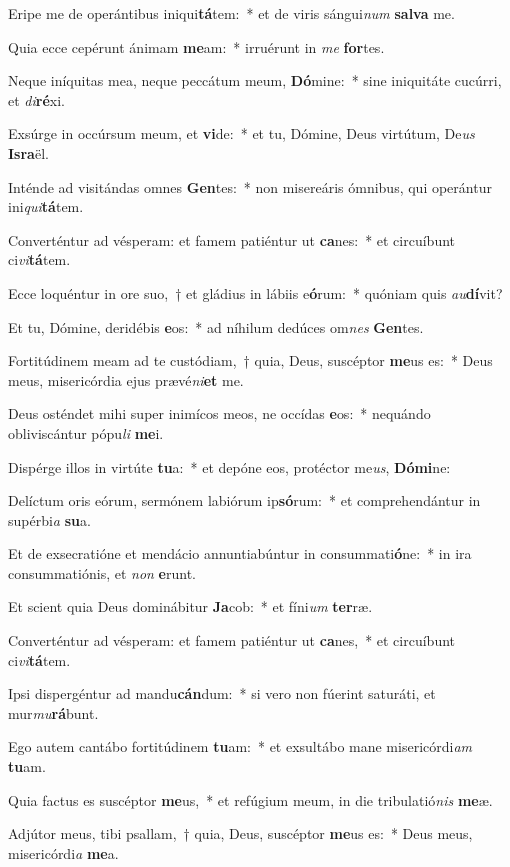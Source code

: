 \item Eripe me de operántibus iniqui\textbf{tá}tem:~* et de viris sángui\textit{num} \textbf{sal}\textbf{va} me.
\item Quia ecce cepérunt ánimam \textbf{me}am:~* irruérunt in \textit{me} \textbf{for}tes.
\item Neque iníquitas mea, neque peccátum meum, \textbf{Dó}mine:~* sine iniquitáte cucúrri, et \textit{di}\textbf{ré}xi.
\item Exsúrge in occúrsum meum, et \textbf{vi}de:~* et tu, Dómine, Deus virtútum, De\textit{us} \textbf{Is}\textbf{ra}ël.
\item Inténde ad visitándas omnes \textbf{Gen}tes:~* non misereáris ómnibus, qui operántur ini\textit{qui}\textbf{tá}tem.
\item Converténtur ad vésperam: et famem patiéntur ut \textbf{ca}nes:~* et circuíbunt ci\textit{vi}\textbf{tá}tem.
\item Ecce loquéntur in ore suo,~† et gládius in lábiis e\textbf{ó}rum:~* quóniam quis \textit{au}\textbf{dí}vit?
\item Et tu, Dómine, deridébis \textbf{e}os:~* ad níhilum dedúces om\textit{nes} \textbf{Gen}tes.
\item Fortitúdinem meam ad te custódiam,~† quia, Deus, suscéptor \textbf{me}us es:~* Deus meus, misericórdia ejus prævé\textit{ni}\textbf{et} me.
\item Deus osténdet mihi super inimícos meos, ne occídas \textbf{e}os:~* nequándo obliviscántur pópu\textit{li} \textbf{me}i.
\item Dispérge illos in virtúte \textbf{tu}a:~* et depóne eos, protéctor me\textit{us}, \textbf{Dó}\textbf{mi}ne:
\item Delíctum oris eórum, sermónem labiórum ip\textbf{só}rum:~* et comprehendántur in supérbi\textit{a} \textbf{su}a.
\item Et de exsecratióne et mendácio annuntiabúntur in consummati\textbf{ó}ne:~* in ira consummatiónis, et \textit{non} \textbf{e}runt.
\item Et scient quia Deus dominábitur \textbf{Ja}cob:~* et fíni\textit{um} \textbf{ter}ræ.
\item Converténtur ad vésperam: et famem patiéntur ut \textbf{ca}nes,~* et circuíbunt ci\textit{vi}\textbf{tá}tem.
\item Ipsi dispergéntur ad mandu\textbf{cán}dum:~* si vero non fúerint saturáti, et mur\textit{mu}\textbf{rá}bunt.
\item Ego autem cantábo fortitúdinem \textbf{tu}am:~* et exsultábo mane misericórdi\textit{am} \textbf{tu}am.
\item Quia factus es suscéptor \textbf{me}us,~* et refúgium meum, in die tribulatió\textit{nis} \textbf{me}æ.
\item Adjútor meus, tibi psallam,~† quia, Deus, suscéptor \textbf{me}us es:~* Deus meus, misericórdi\textit{a} \textbf{me}a.

